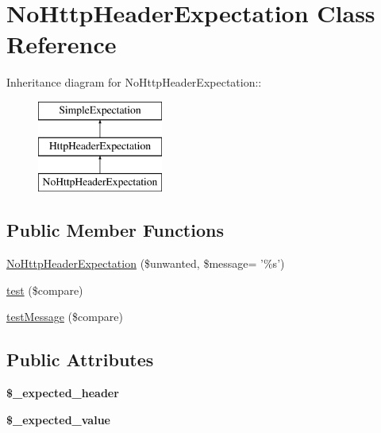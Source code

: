 \hypertarget{class_no_http_header_expectation}{
\section{NoHttpHeaderExpectation Class Reference}
\label{class_no_http_header_expectation}
}
Inheritance diagram for NoHttpHeaderExpectation::\begin{figure}[H]
\begin{center}
\leavevmode
\includegraphics[height=3cm]{class_no_http_header_expectation}
\end{center}
\end{figure}
\subsection*{Public Member Functions}
\begin{DoxyCompactItemize}
\item 
\hyperlink{class_no_http_header_expectation_a1ec58432436426be602808bded11d776}{NoHttpHeaderExpectation} (\$unwanted, \$message= '\%s')
\item 
\hyperlink{class_no_http_header_expectation_a3eeb88677fbcc6f33f719aec17d93013}{test} (\$compare)
\item 
\hyperlink{class_no_http_header_expectation_a5fcd01471616efc71a8e28d2e8380ccb}{testMessage} (\$compare)
\end{DoxyCompactItemize}
\subsection*{Public Attributes}
\begin{DoxyCompactItemize}
\item 
\hypertarget{class_no_http_header_expectation_a422a811b2163bf6965a9ae82fd2a5bd6}{
{\bfseries \$\_\-expected\_\-header}}
\label{class_no_http_header_expectation_a422a811b2163bf6965a9ae82fd2a5bd6}

\item 
\hypertarget{class_no_http_header_expectation_a13a8f90b97d0bddf87320eb39ee802bf}{
{\bfseries \$\_\-expected\_\-value}}
\label{class_no_http_header_expectation_a13a8f90b97d0bddf87320eb39ee802bf}

\end{DoxyCompactItemize}


